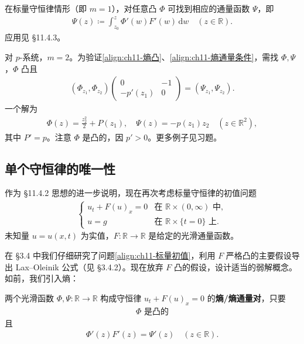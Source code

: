 \documentclass[../../main.tex]{subfiles}
\begin{document}
\begin{example}\label{example:ch11-标量熵}
在标量守恒律情形（即 $m=1$），对任意凸 $\Phi$ 可找到相应的通量函数 $\Psi$，即
\begin{align*}
\Psi(z)\coloneqq\int_{z_0}^z\Phi'(w)F'(w)\,\mathrm{d}w \quad (z\in\mathbb{R}).
\end{align*}
应用见 \S11.4.3。
\end{example}

\begin{example}\label{example:ch11-p系统熵}
对 $p$-系统，$m=2$。为验证\eqref{align:ch11-熵凸}、\eqref{align:ch11-熵通量条件}，需找 $\Phi,\Psi$，$\Phi$ 凸且
\begin{align*}
(\Phi_{z_1},\Phi_{z_2})\begin{pmatrix}0 & -1\\ -p'(z_1) & 0\end{pmatrix}=(\Psi_{z_1},\Psi_{z_2}).
\end{align*}
一个解为
\begin{align*}
\Phi(z)=\frac{z_2^2}{2}+P(z_1),\quad \Psi(z)=-p(z_1)z_2 \quad (z\in\mathbb{R}^2),
\end{align*}
其中 $P'=p$。注意 $\Phi$ 是凸的，因 $p'>0$。更多例子见习题。
\end{example}

\subsection{单个守恒律的唯一性}\label{subsection:ch11-标量守恒律唯一性}

作为 \S11.4.2 思想的进一步说明，现在再次考虑标量守恒律的初值问题
\begin{align}
\begin{cases}
u_t+F(u)_x=0 & \text{在 } \mathbb{R}\times(0,\infty) \text{ 中},\\
u=g & \text{在 } \mathbb{R}\times\{t=0\} \text{ 上}.
\end{cases}
\label{align:ch11-标量初值}
\end{align}
未知量 $u=u(x,t)$ 为实值，$F:\mathbb{R}\to\mathbb{R}$ 是给定的光滑通量函数。

在 \S3.4 中我们仔细研究了问题\eqref{align:ch11-标量初值}，利用 $F$ 严格凸的主要假设导出 Lax--Oleinik 公式（见 \S3.4.2）。现在放弃 $F$ 凸的假设，设计适当的弱解概念。如前，我们引入熵：

\begin{definition}\label{definition:ch11-标量熵对}
两个光滑函数 $\Phi,\Psi:\mathbb{R}\to\mathbb{R}$ 构成守恒律 $u_t+F(u)_x=0$ 的\textbf{熵/熵通量对}，只要
\begin{align}
\Phi \text{ 是凸的}
\label{align:ch11-标量熵凸}
\end{align}
且
\begin{align}
\Phi'(z)F'(z)=\Psi'(z) \quad (z\in\mathbb{R}).
\label{align:ch11-标量熵通量}
\end{align}
\end{definition}
\end{document}
